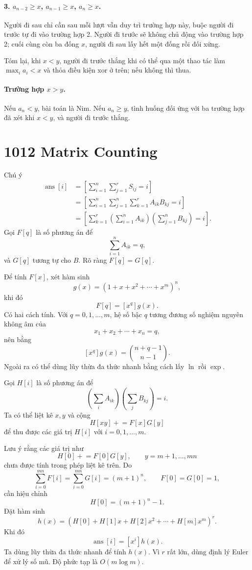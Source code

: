 \documentclass[11pt]{article}
\begin{document}
\paragraph{3. $a_{n-2}\ge x$, $a_{n-1}\ge x$, $a_n\ge x$.}
Người đi sau chỉ cần sau mỗi lượt vẫn duy trì trường hợp này, buộc người đi
trước tự đi vào trường hợp 2. Người đi trước sẽ không chủ động vào trường hợp
2; cuối cùng còn ba đống $x$, người đi sau lấy hết một đống rồi đối xứng.

Tóm lại, khi $x<y$, người đi trước thắng khi có thể qua một thao tác làm
$\max_i a_i<x$ và thỏa điều kiện xor ở trên; nếu không thì thua.

\paragraph{Trường hợp $x>y$.}
Nếu $a_n<y$, bài toán là Nim. Nếu $a_n\ge y$, tình huống đối ứng với ba
trường hợp đã xét khi $x<y$, và người đi trước thắng.

\section{1012 Matrix Counting}

Chú ý
\[
\begin{aligned}
  \operatorname{ans}[i]
  &=
  \left[
    \sum_{i=1}^{n}\sum_{j=1}^{r}S_{ij}=i
  \right]\\
  &=
  \left[
    \sum_{i=1}^{n}\sum_{j=1}^{n}\sum_{k=1}^{r} A_{ik}B_{kj}=i
  \right]\\
  &=
  \left[
    \sum_{k=1}^{r}
    \left(\sum_{i=1}^{n} A_{ik}\right)
    \left(\sum_{j=1}^{n} B_{kj}\right)=i
  \right].
\end{aligned}
\]
Gọi $F[q]$ là số phương án để
\[
  \sum_{i=1}^{n}A_{ik}=q,
\]
và $G[q]$ tương tự cho $B$. Rõ ràng $F[q]=G[q]$.

Để tính $F[x]$, xét hàm sinh
\[
  g(x)=(1+x+x^2+\cdots+x^m)^n,
\]
khi đó
\[
  F[q]=[x^q]g(x).
\]
Có hai cách tính. Với $q=0,1,\ldots,m$, hệ số bậc $q$ tương đương số nghiệm
nguyên không âm của
\[
  x_1+x_2+\cdots+x_n=q,
\]
nên bằng
\[
  [x^q]g(x)=\binom{n+q-1}{n-1}.
\]
Ngoài ra có thể dùng lũy thừa đa thức nhanh bằng cách lấy $\ln$ rồi $\exp$.

Gọi $H[i]$ là số phương án để
\[
  \left(\sum_i A_{ik}\right)\left(\sum_j B_{kj}\right)=i.
\]
Ta có thể liệt kê $x,y$ và cộng
\[
  H[xy]\mathrel{+}=F[x]G[y]
\]
để thu được các giá trị $H[i]$ với $i=0,1,\ldots,m$.

Lưu ý rằng các giá trị như
\[
  H[0]\mathrel{+}=F[0]G[y],\qquad y=m+1,\ldots,mn
\]
chưa được tính trong phép liệt kê trên. Do
\[
  \sum_{i=0}^{mn}F[i]=\sum_{i=0}^{mn}G[i]=(m+1)^n,\qquad F[0]=G[0]=1,
\]
cần hiệu chỉnh
\[
  H[0]=(m+1)^n-1.
\]
Đặt hàm sinh
\[
  h(x)=(H[0]+H[1]x+H[2]x^2+\cdots+H[m]x^m)^r.
\]
Khi đó
\[
  \operatorname{ans}[i]=[x^i]h(x).
\]
Ta dùng lũy thừa đa thức nhanh để tính $h(x)$. Vì $r$ rất lớn, dùng định lý
Euler để xử lý số mũ. Độ phức tạp là $O(m\log m)$.
\end{document}
